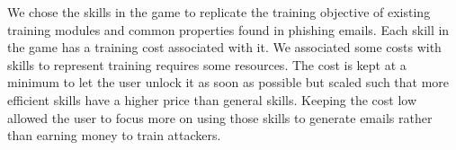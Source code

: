 \begin{table}[h]
    \centering
    \caption{Different skills and their effect in the game}
    \label{tab: attacker}
\end{table}

We chose the skills in the game to replicate the training objective of existing training modules and common properties found in phishing emails. Each skill in the game has a training cost associated with it. We associated some costs with skills to represent training requires some resources. The cost is kept at a minimum to let the user unlock it as soon as possible but scaled such that more efficient skills have a higher price than general skills. Keeping the cost low allowed the user to focus more on using those skills to generate emails rather than earning money to train attackers.

